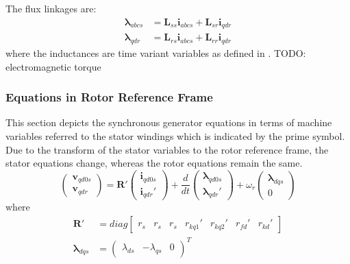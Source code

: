%
The flux linkages are:
%
\begin{align}
  \boldsymbol{\lambda}_{abcs} &= \mathbf{L}_{ss} \mathbf{i}_{abcs} + \mathbf{L}_{sr} \mathbf{i}_{qdr}  \\
  \boldsymbol{\lambda}_{qdr} &= \mathbf{L}_{rs} \mathbf{i}_{abcs} + \mathbf{L}_{rr} \mathbf{i}_{qdr}
\end{align}
%
where the inductances are time variant variables as defined in \cite{krause2002sudhoff}.
TODO: electromagnetic torque

\subsubsection{Equations in Rotor Reference Frame}

This section depicts the synchronous generator equations in terms of machine variables referred to the stator windings which is indicated by the prime symbol. Due to the transform of the stator variables to the rotor reference frame, the stator equations change, whereas the rotor equations remain the same.
%
\begin{equation}
  \begin{pmatrix}
    \mathbf{v}_{qd0s} \\
    \mathbf{v}_{qdr}
  \end{pmatrix}
  =  
  \mathbf{R}'
  \begin{pmatrix}
    \mathbf{i}_{qd0s} \\
    \mathbf{i}_{qdr}'
  \end{pmatrix}
  +
  \frac{d}{dt}
  \begin{pmatrix}
    \boldsymbol{\lambda}_{qd0s} \\
    \boldsymbol{\lambda}_{qdr}'
  \end{pmatrix}
  + \omega_r
  \begin{pmatrix}
    \boldsymbol{\lambda}_{dqs} \\
    0
  \end{pmatrix}
\end{equation}
%
where
%
\begin{align}
  \mathbf{R}' &= diag
  \begin{bmatrix}
    r_s & r_s & r_s & r_{kq1}' & r_{kq2}' & r_{fd}' & r_{kd}' 
  \end{bmatrix} \\
  \boldsymbol{\lambda}_{dqs} &= 
  \begin{pmatrix}
    \lambda_{ds} & -\lambda_{qs} & 0
  \end{pmatrix}^T
\end{align}
